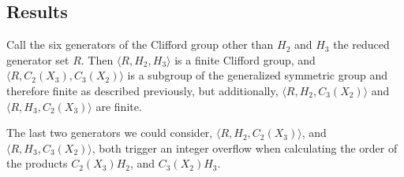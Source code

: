 \subsection{Results}
Call the six generators of the Clifford group other than $H_2$ and $H_3$ the reduced generator set $R$. Then $\langle R, H_2, H_3 \rangle$ is a finite Clifford group, and $\langle R, C_2(X_3), C_3(X_2) \rangle$ is a subgroup of the generalized symmetric group and therefore finite as described previously, but additionally, $\langle R, H_2, C_3(X_2)\rangle$ and $\langle R, H_3, C_2(X_3)\rangle$ are finite.

The last two generators we could consider, $\langle R, H_2, C_2(X_3)\rangle$, and $\langle R, H_3, C_3(X_2)\rangle$, both trigger an integer overflow when calculating the order of the products $C_2(X_3)H_2$, and $C_3(X_2)H_3$.

